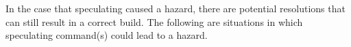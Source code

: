 





In the case that speculating caused a hazard, there are potential resolutions that can still result in a correct build.  The following are situations in which speculating command(s) could lead to a hazard.

